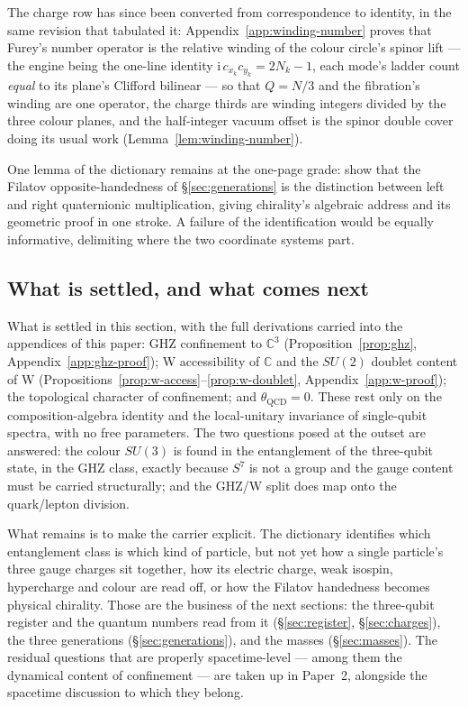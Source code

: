 The charge row has since been converted from correspondence to identity, in the same revision
that tabulated it: Appendix~\ref{app:winding-number} proves that Furey's number operator is the
relative winding of the colour circle's spinor lift --- the engine being the one-line identity
$\mathrm{i}\, c_{x_{k}} c_{y_{k}} = 2N_{k} - 1$, each mode's ladder count \emph{equal} to its
plane's Clifford bilinear --- so that $Q = N/3$ and the fibration's winding are one operator,
the charge thirds are winding integers divided by the three colour planes, and the half-integer
vacuum offset is the spinor double cover doing its usual work
(Lemma~\ref{lem:winding-number}).

\begin{openproblem}\label{op:dictionary-lemmas}
One lemma of the dictionary remains at the one-page grade: show that the Filatov
opposite-handedness of \S\ref{sec:generations} is the distinction between left and right
quaternionic multiplication, giving chirality's algebraic address and its geometric proof in one
stroke. A failure of the identification would be equally informative, delimiting where the two
coordinate systems part.
\end{openproblem}

\subsection{What is settled, and what comes next}

What is settled in this section, with the full derivations carried into the appendices of this paper:
GHZ confinement to $\mathbb{C}^3$ (Proposition~\ref{prop:ghz}, Appendix~\ref{app:ghz-proof}); W
accessibility of $\mathbb{C}$ and the $SU(2)$ doublet content of W
(Propositions~\ref{prop:w-access}--\ref{prop:w-doublet}, Appendix~\ref{app:w-proof}); the topological
character of confinement; and $\theta_{\mathrm{QCD}} = 0$. These rest only on the composition-algebra
identity and the local-unitary invariance of single-qubit spectra, with no free parameters. The two
questions posed at the outset are answered: the colour $SU(3)$ is found in the entanglement of the
three-qubit state, in the GHZ class, exactly because $S^7$ is not a group and the gauge content must
be carried structurally; and the GHZ/W split does map onto the quark/lepton division.

What remains is to make the carrier explicit. The dictionary identifies which entanglement class is
which kind of particle, but not yet how a single particle's three gauge charges sit together, how its
electric charge, weak isospin, hypercharge and colour are read off, or how the Filatov handedness
becomes physical chirality. Those are the business of the next sections: the three-qubit register and
the quantum numbers read from it (\S\ref{sec:register}, \S\ref{sec:charges}), the three generations
(\S\ref{sec:generations}), and the masses (\S\ref{sec:masses}). The residual questions that are
properly spacetime-level --- among them the dynamical content of confinement --- are taken up in
Paper~2, alongside the spacetime discussion to which they belong.
